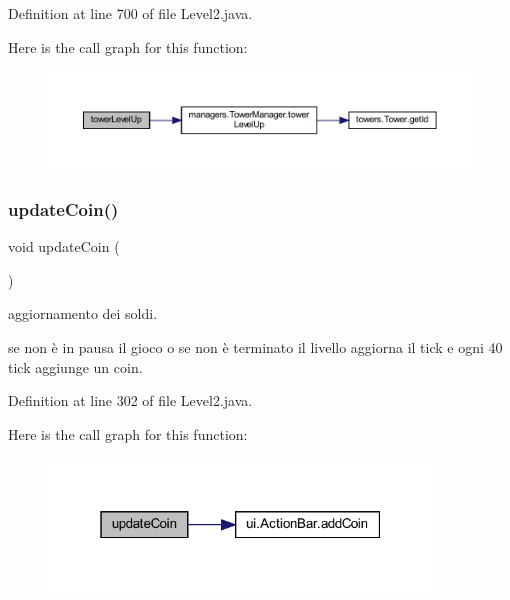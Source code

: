 Definition at line 700 of file Level2.\+java.

Here is the call graph for this function\+:
\nopagebreak
\begin{figure}[H]
\begin{center}
\leavevmode
\includegraphics[width=350pt]{classscenes_1_1_level2_a8a3c715fcfd3d65e1d8241a1fa4965ff_cgraph}
\end{center}
\end{figure}
\mbox{\label{classscenes_1_1_level2_a7ca93fcd8c7440e7b3f64c595a5be28c}} 
\subsubsection{\texorpdfstring{update\+Coin()}{updateCoin()}}
{\footnotesize\ttfamily void update\+Coin (\begin{DoxyParamCaption}{ }\end{DoxyParamCaption})}



aggiornamento dei soldi. 

se non è in pausa il gioco o se non è terminato il livello aggiorna il tick e ogni 40 tick aggiunge un coin. 

Definition at line 302 of file Level2.\+java.

Here is the call graph for this function\+:\nopagebreak
\begin{figure}[H]
\begin{center}
\leavevmode
\includegraphics[width=289pt]{classscenes_1_1_level2_a7ca93fcd8c7440e7b3f64c595a5be28c_cgraph}
\end{center}
\end{figure}
\mbox{\label{classscenes_1_1_level2_af005ec68c869a6acd5e833cba9330a50}} 
